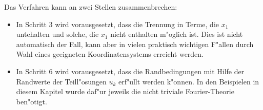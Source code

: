 Das Verfahren kann an zwei Stellen zusammenbrechen:
\begin{itemize}
\item In Schritt 3 wird vorausgesetzt, dass die Trennung in 
Terme, die $x_1$ untehalten  und solche, die $x_1$ nicht enthalten
m"oglich ist. Dies ist nicht automatisch der Fall, kann aber in
vielen praktisch wichtigen F"allen durch Wahl eines geeigneten
Koordinatensystems erreicht werden.
\item In Schritt 6 wird vorausgesetzt, dass die Randbedingungen
mit Hilfe der Randwerte der Teill"osungen $u_k$ erf"ullt werden
k"onnen. In den Beispielen in diesem Kapitel wurde daf"ur jeweils
die nicht triviale Fourier-Theorie ben"otigt. 
\end{itemize}
